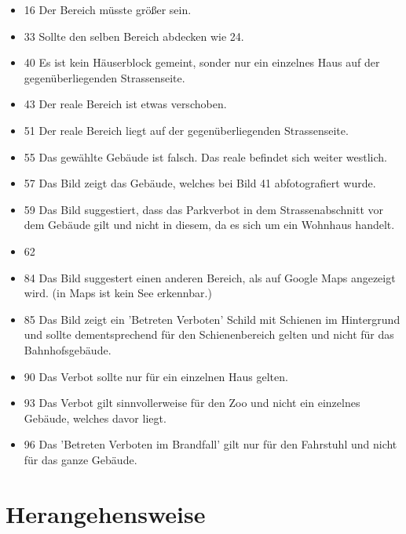 \begin{itemize}
\item 16 Der Bereich müsste größer sein.
\item 33 Sollte den selben Bereich abdecken wie 24.
\item 40 Es ist kein Häuserblock gemeint, sonder nur ein einzelnes Haus auf der gegenüberliegenden Strassenseite.
\item 43 Der reale Bereich ist etwas verschoben.
\item 51 Der reale Bereich liegt auf der gegenüberliegenden Strassenseite.
\item 55 Das gewählte Gebäude ist falsch. Das reale befindet sich weiter westlich.
\item 57 Das Bild zeigt das Gebäude, welches bei Bild 41 abfotografiert wurde.
\item 59 Das Bild suggestiert, dass das Parkverbot in dem Strassenabschnitt vor dem Gebäude gilt und nicht in diesem, da es sich um ein Wohnhaus handelt.
\item 62
\item 84 Das Bild suggestert einen anderen Bereich, als auf Google Maps angezeigt wird. (in Maps ist kein See erkennbar.)
\item 85 Das Bild zeigt ein 'Betreten Verboten' Schild mit Schienen im Hintergrund und sollte dementsprechend für den Schienenbereich gelten und nicht für das Bahnhofsgebäude.
\item 90 Das Verbot sollte nur für ein einzelnen Haus gelten.
\item 93 Das Verbot gilt sinnvollerweise für den Zoo und nicht ein einzelnes Gebäude, welches davor liegt.
\item 96 Das 'Betreten Verboten im Brandfall' gilt nur für den Fahrstuhl und nicht für das ganze Gebäude.
\end{itemize}

\section{Herangehensweise}
